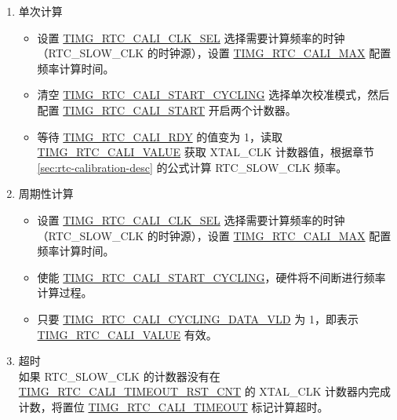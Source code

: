 \documentclass[main\_\_CN.tex]{subfiles}
\begin{document}
\begin{enumerate}
    \item 单次计算
    \begin{itemize}
        \item 设置 \hyperref[fielddesc:TIMGRTCCALICLKSEL]{TIMG\_RTC\_CALI\_CLK\_SEL} 选择需要计算频率的时钟（RTC\_SLOW\_CLK 的时钟源），设置 \hyperref[fielddesc:TIMGRTCCALIMAX]{TIMG\_RTC\_CALI\_MAX} 配置频率计算时间。
        \item 清空 \hyperref[fielddesc:TIMGRTCCALISTARTCYCLING]{TIMG\_RTC\_CALI\_START\_CYCLING} 选择单次校准模式，然后配置 \hyperref[fielddesc:TIMGRTCCALISTART]{TIMG\_RTC\_CALI\_START} 开启两个计数器。
        \item 等待  \hyperref[fielddesc:TIMGRTCCALIRDY]{TIMG\_RTC\_CALI\_RDY} 的值变为 1，读取 \hyperref[fielddesc:TIMGRTCCALIVALUE]{TIMG\_RTC\_CALI\_VALUE} 获取 XTAL\_CLK 计数器值，根据章节 \ref{sec:rtc-calibration-desc} 的公式计算 RTC\_SLOW\_CLK 频率。
    \end{itemize}
    \item 周期性计算
    \begin{itemize}
        \item 设置 \hyperref[fielddesc:TIMGRTCCALICLKSEL]{TIMG\_RTC\_CALI\_CLK\_SEL} 选择需要计算频率的时钟（RTC\_SLOW\_CLK 的时钟源），设置 \hyperref[fielddesc:TIMGRTCCALIMAX]{TIMG\_RTC\_CALI\_MAX} 配置频率计算时间。
        \item 使能 \hyperref[fielddesc:TIMGRTCCALISTARTCYCLING]{TIMG\_RTC\_CALI\_START\_CYCLING}，硬件将不间断进行频率计算过程。
        \item 只要 \hyperref[fielddesc:TIMGRTCCALICYCLINGDATAVLD]{TIMG\_RTC\_CALI\_CYCLING\_DATA\_VLD} 为 1，即表示 \hyperref[fielddesc:TIMGRTCCALIVALUE]{TIMG\_RTC\_CALI\_VALUE} 有效。
    \end{itemize}
    \item 超时\\
    如果 RTC\_SLOW\_CLK 的计数器没有在 \hyperref[fielddesc:TIMGRTCCALITIMEOUTRSTCNT]{TIMG\_RTC\_CALI\_TIMEOUT\_RST\_CNT} 的 XTAL\_CLK 计数器内完成计数，将置位 \hyperref[fielddesc:TIMGRTCCALITIMEOUT]{TIMG\_RTC\_CALI\_TIMEOUT} 标记计算超时。
\end{enumerate}


\end{document}
